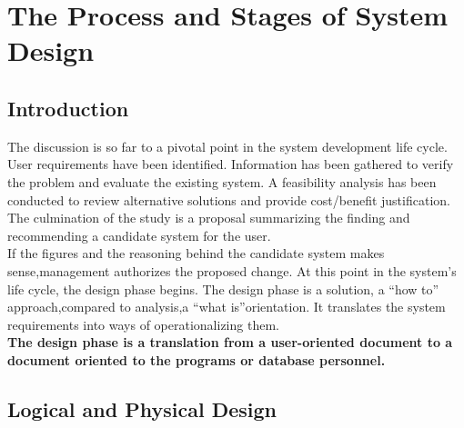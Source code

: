 \documentclass[a4paper,12pt]{report}
\begin{document}
	\tableofcontents
	\listoffigures
	\newpage
\chapter{The Process and Stages of System Design}	
\section{Introduction}
The discussion is so far to a pivotal point in the system development life cycle. User requirements have been identified. Information has been gathered to verify the problem and evaluate the existing system. A feasibility analysis has been conducted to review alternative solutions and provide cost/benefit justification.  The culmination of the study is a proposal summarizing the finding and recommending a candidate system for the user.\\

If the figures and the reasoning behind the candidate system makes sense,management authorizes the proposed change. At this point in the system's life cycle, the design phase begins. The design phase is a solution, a “how to” approach,compared to analysis,a “what is”orientation. It translates the system requirements into ways of operationalizing them.\\
\textbf{The design phase is a translation from a user-oriented document to a document oriented to the programs or database personnel.} 
	\section{Logical and Physical Design}
	
\end{document}
